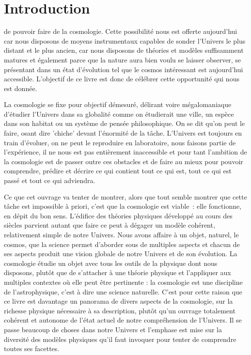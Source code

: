 \chapter*{Introduction}
 de pouvoir faire de la cosmologie. Cette possibilité nous est offerte aujourd'hui car nous disposons de moyens instrumentaux capables de sonder l'Univers le plus distant et le plus ancien, car nous disposons de théories et modèles suffisamment matures et également parce que la nature aura bien voulu se laisser observer, se présentant dans un état d'évolution tel que le cosmos intéressant est aujourd'hui accessible. 
L'objectif de ce livre est donc de célébrer cette opportunité qui nous est donnée.

La cosmologie se fixe pour objectif démesuré, délirant voire mégalomaniaque d'étudier l'Univers dans sa globalité comme on étudierait une ville, un espèce dans son habitat ou un système de pensée philosophique. On se dit qu'on peut le faire, osant dire 'chiche' devant l'énormité de la tâche. L'Univers  est toujours en train d'évoluer, on ne peut le reproduire en laboratoire, nous faisons partie de l'expérience, il ne nous est pas entièrement inaccessible et pour tant l'ambition de la cosmologie est de passer outre ces obstacles et de faire au mieux pour pouvoir comprendre, prédire et décrire ce qui contient tout ce qui est, tout ce qui est passé et tout ce qui adviendra.

Ce que cet ouvrage va tenter de montrer, alors que tout semble montrer que cette tâche est impossible à priori, c'est que la cosmologie est viable~: elle fonctionne, en dépit du bon sens. L'édifice des théories physiques développé au cours des siècles parvient autant que faire ce peut à dégager un modèle cohérent, relativement simple de notre Univers. Nous avons affaire à un objet, naturel, le cosmos, que la science permet d'aborder sous de multiples aspects et chacun de ses aspects produit une vision globale de notre Univers et de son évolution. La cosmologie étudie un objet avec tous les outils de la physique dont nous disposons, plutôt que de s'attacher à une théorie physique et l'appliquer aux multiples contextes où elle peut être pertinente : la cosmologie est une discipline de l'astrophysique, c'est à dire une science naturelle. C'est pour cette raison que ce livre est davantage un panorama de divers aspects de la cosmologie, sur la richesse physique nécessaire à sa description, plutôt qu'un ouvrage totalement cohérent et autonome de l'état actuel de notre compréhension de l'Univers. Il se passe beaucoup de choses dans notre Univers et l'emphase est mise sur la diversité des modèles physiques qu'il faut invoquer pour tenter de comprendre toutes ses facettes.

